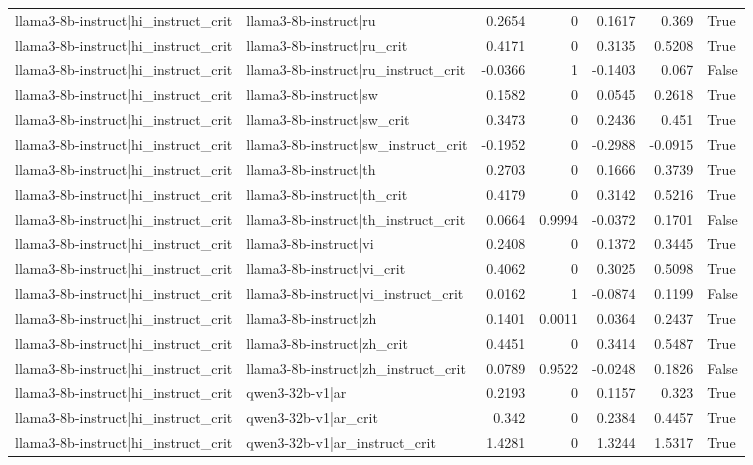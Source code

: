 \begin{table}
\begin{tabular}{l l r r r r l}
llama3-8b-instruct|hi_instruct_crit & llama3-8b-instruct|ru & 0.2654 & 0 & 0.1617 & 0.369 & True \\
llama3-8b-instruct|hi_instruct_crit & llama3-8b-instruct|ru_crit & 0.4171 & 0 & 0.3135 & 0.5208 & True \\
llama3-8b-instruct|hi_instruct_crit & llama3-8b-instruct|ru_instruct_crit & -0.0366 & 1 & -0.1403 & 0.067 & False \\
llama3-8b-instruct|hi_instruct_crit & llama3-8b-instruct|sw & 0.1582 & 0 & 0.0545 & 0.2618 & True \\
llama3-8b-instruct|hi_instruct_crit & llama3-8b-instruct|sw_crit & 0.3473 & 0 & 0.2436 & 0.451 & True \\
llama3-8b-instruct|hi_instruct_crit & llama3-8b-instruct|sw_instruct_crit & -0.1952 & 0 & -0.2988 & -0.0915 & True \\
llama3-8b-instruct|hi_instruct_crit & llama3-8b-instruct|th & 0.2703 & 0 & 0.1666 & 0.3739 & True \\
llama3-8b-instruct|hi_instruct_crit & llama3-8b-instruct|th_crit & 0.4179 & 0 & 0.3142 & 0.5216 & True \\
llama3-8b-instruct|hi_instruct_crit & llama3-8b-instruct|th_instruct_crit & 0.0664 & 0.9994 & -0.0372 & 0.1701 & False \\
llama3-8b-instruct|hi_instruct_crit & llama3-8b-instruct|vi & 0.2408 & 0 & 0.1372 & 0.3445 & True \\
llama3-8b-instruct|hi_instruct_crit & llama3-8b-instruct|vi_crit & 0.4062 & 0 & 0.3025 & 0.5098 & True \\
llama3-8b-instruct|hi_instruct_crit & llama3-8b-instruct|vi_instruct_crit & 0.0162 & 1 & -0.0874 & 0.1199 & False \\
llama3-8b-instruct|hi_instruct_crit & llama3-8b-instruct|zh & 0.1401 & 0.0011 & 0.0364 & 0.2437 & True \\
llama3-8b-instruct|hi_instruct_crit & llama3-8b-instruct|zh_crit & 0.4451 & 0 & 0.3414 & 0.5487 & True \\
llama3-8b-instruct|hi_instruct_crit & llama3-8b-instruct|zh_instruct_crit & 0.0789 & 0.9522 & -0.0248 & 0.1826 & False \\
llama3-8b-instruct|hi_instruct_crit & qwen3-32b-v1|ar & 0.2193 & 0 & 0.1157 & 0.323 & True \\
llama3-8b-instruct|hi_instruct_crit & qwen3-32b-v1|ar_crit & 0.342 & 0 & 0.2384 & 0.4457 & True \\
llama3-8b-instruct|hi_instruct_crit & qwen3-32b-v1|ar_instruct_crit & 1.4281 & 0 & 1.3244 & 1.5317 & True \\

\end{tabular}
\end{table}
